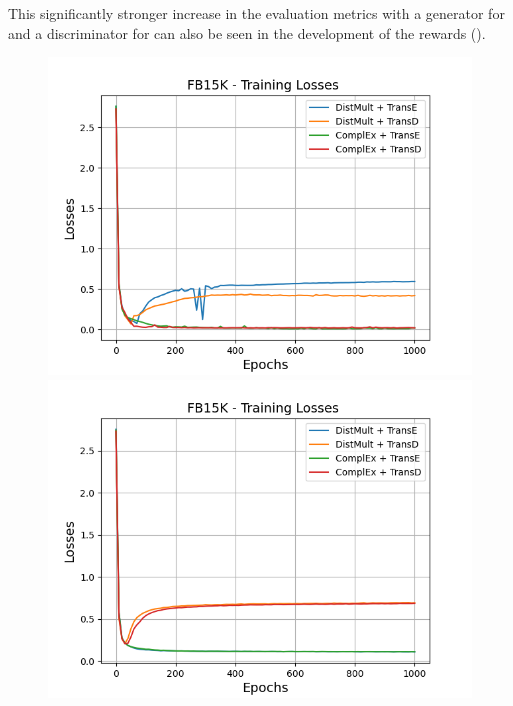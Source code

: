 This significantly stronger increase in the evaluation metrics with a \distmult generator for \usmax and a \transd discriminator for \ussoftmax can also be seen in the development of the rewards ().
\begin{figure}[H]
    \centering
    \begin{minipage}{.5\textwidth}
      \centering
      \includegraphics[width=0.9\linewidth]{figures/results/gan_train/not_pretrained/uncertainty/max/entropy/fb15k/1k_epochs/uncertainty_fb15k_losses.png}
    \end{minipage}%
    \begin{minipage}{.5\textwidth}
      \centering
      \includegraphics[width=0.9\linewidth]{figures/results/gan_train/not_pretrained/uncertainty/max_distribution/entropy/fb15k/1k_epochs/uncertainty_fb15k_losses.png}
    \end{minipage}

\end{figure}
